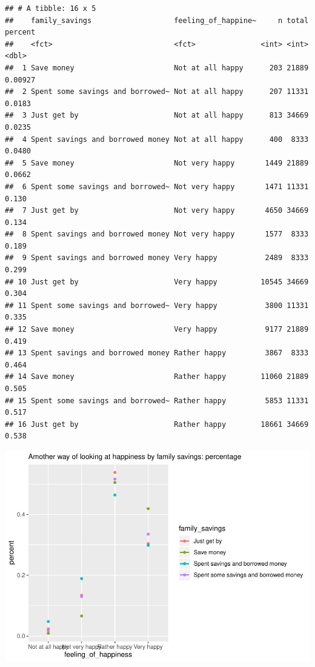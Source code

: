 \documentclass[man,floatsintext]{apa6}
\begin{document}
\begin{verbatim}
## # A tibble: 16 x 5
##    family_savings                   feeling_of_happine~     n total percent
##    <fct>                            <fct>               <int> <int>   <dbl>
##  1 Save money                       Not at all happy      203 21889 0.00927
##  2 Spent some savings and borrowed~ Not at all happy      207 11331 0.0183 
##  3 Just get by                      Not at all happy      813 34669 0.0235 
##  4 Spent savings and borrowed money Not at all happy      400  8333 0.0480 
##  5 Save money                       Not very happy       1449 21889 0.0662 
##  6 Spent some savings and borrowed~ Not very happy       1471 11331 0.130  
##  7 Just get by                      Not very happy       4650 34669 0.134  
##  8 Spent savings and borrowed money Not very happy       1577  8333 0.189  
##  9 Spent savings and borrowed money Very happy           2489  8333 0.299  
## 10 Just get by                      Very happy          10545 34669 0.304  
## 11 Spent some savings and borrowed~ Very happy           3800 11331 0.335  
## 12 Save money                       Very happy           9177 21889 0.419  
## 13 Spent savings and borrowed money Rather happy         3867  8333 0.464  
## 14 Save money                       Rather happy        11060 21889 0.505  
## 15 Spent some savings and borrowed~ Rather happy         5853 11331 0.517  
## 16 Just get by                      Rather happy        18661 34669 0.538
\end{verbatim}

\includegraphics{610_final_files/figure-latex/happiness and family savings JW-3.pdf}
\end{document}
